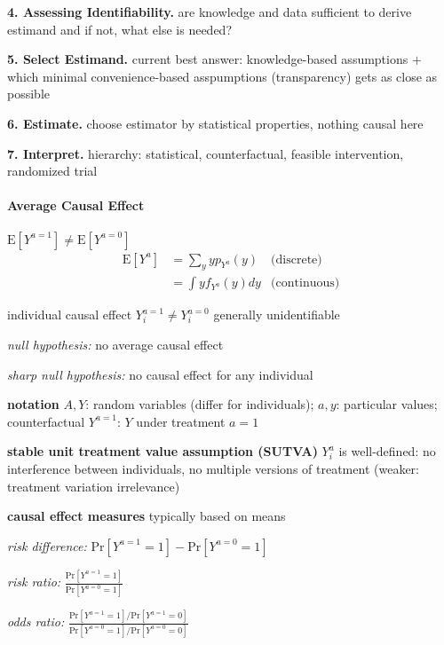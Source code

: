\documentclass[8pt,twoside]{extarticle}
\begin{document}
\begin{multicols}{2}
\noindent \textbf{4. Assessing Identifiability.} are knowledge and data sufficient to derive estimand and if not, what else is needed?

\noindent \textbf{5. Select Estimand.} current best answer: knowledge-based assumptions $+$ which minimal convenience-based asspumptions (transparency) gets as close as possible

\noindent \textbf{6. Estimate.} choose estimator by statistical properties, nothing causal here

\noindent \textbf{7. Interpret.} hierarchy: statistical, counterfactual, feasible intervention, randomized trial


\paragraph{Average Causal Effect} $\mathrm{E}\left[Y^{a=1}\right] \neq \mathrm{E}\left[Y^{a=0}\right]$
\begin{align*}
\mathrm{E}\left[Y^{a}\right]   &=  \sum_yyp_{Y^a}(y)  &\text{(discrete)}\\
   &=  \int yf_{Y^a}(y)dy &\text{(continuous)}
\end{align*}

\noindent individual causal effect $Y_i^{a=1} \neq Y_i^{a=0}$ generally unidentifiable

\noindent \textit{null hypothesis:} no average causal effect

\noindent \textit{sharp null hypothesis:} no causal effect for any individual

\noindent \textbf{notation} $A,Y$: random variables (differ for individuals);
$a,y$: particular values; counterfactual $Y^{a=1}$: $Y$ under treatment $a=1$

\noindent  \textbf{stable unit treatment value assumption (SUTVA)} $Y_i^a$ is well-defined: no interference between individuals, no multiple versions of treatment (weaker: treatment variation irrelevance)

\noindent  \textbf{causal effect measures} typically based on means

\textit{risk difference:}  $\mathrm{Pr}\left[Y^{a=1}=1\right] - \mathrm{Pr}\left[Y^{a=0}=1\right]$

\textit{risk ratio:} $\frac{\mathrm{Pr}\left[Y^{a=1}=1\right]}{ \mathrm{Pr}\left[Y^{a=0}=1\right]}$

\textit{odds ratio:} $\frac{\mathrm{Pr}\left[Y^{a=1}=1\right]/\mathrm{Pr}\left[Y^{a=1}=0\right]}{ \mathrm{Pr}\left[Y^{a=0}=1\right]/\mathrm{Pr}\left[Y^{a=0}=0\right]}$


\end{multicols}
\end{document}

